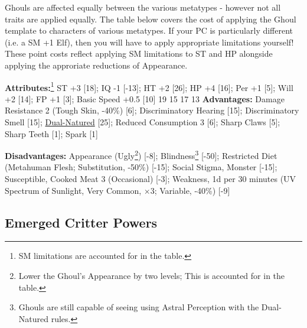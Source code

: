 \begin{multicols*}{3}
	Ghouls are affected equally between the various metatypes - however not all traits are applied equally. The table below covers the cost of applying the Ghoul template to characters of various metatypes. If your PC is particularly different (i.e. a SM +1 Elf), then you will have to apply appropriate limitations yourself!	These point costs reflect applying SM limitations to ST and HP alongside applying the approriate reductions of Appearance.
	
	\begin{center}
		\begin{adjustwidth}{-9mm}{}
		\end{adjustwidth}
	\end{center}
	
	\textbf{Attributes:}\footnote{SM limitations are accounted for in the table.}
	ST +3 [18]; IQ -1 [-13]; HT +2 [26]; HP +4 [16]; Per +1 [5]; Will +2 [14]; FP +1 [3]; Basic Speed +0.5 [10]	
	19 15
	17 13
	\textbf{Advantages:}
	Damage Resistance 2 (Tough Skin, -40\%) [6]; Discriminatory Hearing [15]; Discriminatory Smell [15]; \hyperref[dual_natured]{Dual-Natured} [25]; Reduced Consumption 3 [6]; Sharp Claws [5]; Sharp Teeth [1]; Spark [1]
	
	\textbf{Disadvantages:}
	Appearance (Ugly\footnote{Lower the Ghoul's Appearance by two levels; This is accounted for in the table.}) [-8]; Blindness\footnote{Ghouls are still capable of seeing using Astral Perception with the Dual-Natured rules.} [-50]; Restricted Diet (Metahuman Flesh; Substitution, -50\%) [-15]; Social Stigma, Monster [-15]; Susceptible, Cooked Meat 3 (Occasional) [-3]; Weakness, 1d per 30 minutes (UV Spectrum of Sunlight, Very Common, $\times$3; Variable, -40\%) [-9]
	
	\subsection{Emerged Critter Powers}
	

\end{multicols*}
